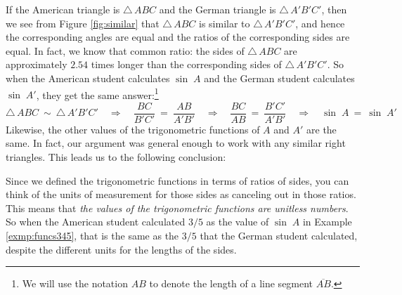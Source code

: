 If the American triangle is $\triangle\,ABC$ and the German triangle is $\triangle\,A'B'C'$, then
we see from Figure \ref{fig:similar} that $\triangle\,ABC$ is similar to $\triangle\,A'B'C'$, and
hence the corresponding angles are equal and the ratios of the corresponding sides are equal. In
fact, we know that common ratio: the sides of $\triangle\,ABC$ are approximately $2.54$ times longer
than the corresponding sides of $\triangle\,A'B'C'$. So when the American student calculates
$\sin\;A$ and the German student calculates $\sin\;A'$, they get the same answer:\footnote{We will
use the notation $AB$ to denote the length of a line segment $\overline{AB}$.}
\begin{displaymath}
 \triangle\,ABC ~\sim~ \triangle\,A'B'C' \quad\Rightarrow\quad
 \dfrac{BC}{B'C'} ~=~ \dfrac{AB}{A'B'} \quad\Rightarrow\quad
 \dfrac{BC}{AB} ~=~ \dfrac{B'C'}{A'B'} \quad\Rightarrow\quad \sin\;A ~=~ \sin\;A'
\end{displaymath}
Likewise, the other values of the trigonometric functions of $A$ and $A'$
are the same. In fact, our argument was general enough to work with any similar
right triangles. This leads us to the following conclusion:\vspace{1mm}

\begin{center}\end{center}

Since we defined the trigonometric functions in terms of ratios of sides, you can think of the
units of measurement for those sides as canceling out in those ratios. This means that \emph{the
values of the trigonometric functions are unitless numbers}. So when the American student
calculated $3/5$ as the value of $\sin\;A$ in Example \ref{exmp:funcs345}, that is the same as
the $3/5$ that the German student calculated, despite the different units for the
lengths of the sides.

